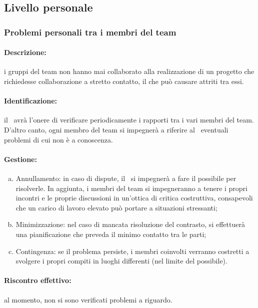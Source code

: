 \documentclass[../PianoProgetto.tex]{subfiles}
\begin{document}
\subsection{Livello personale}

\subsubsection{Problemi personali tra i membri del team}

	\paragraph*{Descrizione:} i gruppi del team non hanno mai collaborato alla realizzazione di un progetto che richiedesse collaborazione a stretto contatto, il che può causare attriti tra essi.
	
	\paragraph*{Identificazione:} il \responsabilediprogetto\ avrà l’onere di verificare periodicamente i rapporti tra i vari membri del team. D’altro canto, ogni membro del team si impegnerà a riferire al \responsabilediprogetto\ eventuali problemi di cui non è a conoscenza.
	
	\paragraph*{Gestione:}
	\begin{enumerate}[(a)]
		\item Annullamento: in caso di dispute, il \responsabilediprogetto\ si impegnerà a fare il possibile per risolverle. In aggiunta, i membri del team si impegneranno a tenere i propri incontri e le proprie discussioni in un'ottica di critica costruttiva, consapevoli che un carico di lavoro elevato può portare a situazioni stressanti;
		\item Minimizzazione: nel caso di mancata risoluzione del contrasto, si effettuerà una pianificazione che preveda il minimo contatto tra le parti; 
		\item Contingenza: se il problema persiste, i membri coinvolti verranno costretti a svolgere i propri compiti in luoghi differenti (nel limite del possibile).
	\end{enumerate}	
	
	\paragraph*{Riscontro effettivo:} al momento, non si sono verificati problemi a riguardo.
\end{document}
